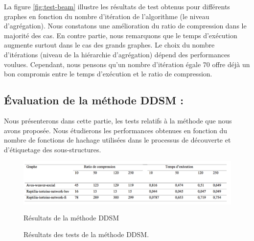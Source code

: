 	
	  La figure \ref{fig:test-beam} illustre les résultats de test obtenus pour différents graphes en fonction du nombre d'itération de l'algorithme (le niveau d'agrégation). Nous constatons une amélioration du ratio de compression dans le majorité des cas. En contre partie, nous remarquons que le temps d'exécution  augmente surtout dans le cas des grands graphes. Le choix du nombre d'itérations (niveau de la hiérarchie d'agrégation) dépend des performances voulues. Cependant, nous pensons qu'un  nombre d'itération égale 70 offre déjà un bon compromis entre le temps d'exécution et le ratio de compression.
	
	
	\subsection{Évaluation de la méthode DDSM :}
	
	Nous présenterons dans cette partie, les tests relatifs à la méthode que nous avons proposée. Nous étudierons les performances obtenues en fonction du nombre de fonctions de hachage utilisées dans le processus de découverte et d'étiquetage des sous-structures. 
\begin{figure}[H]
	
	\includegraphics[scale=0.4]{ressources/image/grDDSM.png}
	\label{fig:perte }
	\caption{Résultats de la méthode DDSM}
\end{figure}
		\begin{figure}[H]
		\begin{center}
			\hspace{3em}
			\hspace{3em}
			
			\caption{Résultats des tests de la méthode DDSM.}
			\label{fig:test-ddsm}
		\end{center}
	\end{figure}
	
